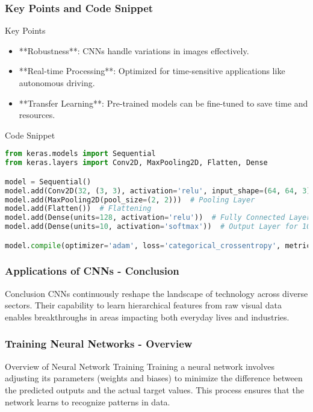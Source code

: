 \documentclass[aspectratio=169]{beamer}
\begin{document}
\begin{frame}[fragile]
    \frametitle{Key Points and Code Snippet}
    \begin{block}{Key Points}
        \begin{itemize}
            \item **Robustness**: CNNs handle variations in images effectively.
            \item **Real-time Processing**: Optimized for time-sensitive applications like autonomous driving.
            \item **Transfer Learning**: Pre-trained models can be fine-tuned to save time and resources.
        \end{itemize}
    \end{block}
    
    \begin{block}{Code Snippet}
        \begin{lstlisting}[language=Python]
from keras.models import Sequential
from keras.layers import Conv2D, MaxPooling2D, Flatten, Dense

model = Sequential()
model.add(Conv2D(32, (3, 3), activation='relu', input_shape=(64, 64, 3)))  # Convolutional Layer
model.add(MaxPooling2D(pool_size=(2, 2)))  # Pooling Layer
model.add(Flatten())  # Flattening
model.add(Dense(units=128, activation='relu'))  # Fully Connected Layer
model.add(Dense(units=10, activation='softmax'))  # Output Layer for 10 classes

model.compile(optimizer='adam', loss='categorical_crossentropy', metrics=['accuracy'])
        \end{lstlisting}
    \end{block}
\end{frame}

\begin{frame}[fragile]
    \frametitle{Applications of CNNs - Conclusion}
    \begin{block}{Conclusion}
        CNNs continuously reshape the landscape of technology across diverse sectors. 
        Their capability to learn hierarchical features from raw visual data enables breakthroughs in areas impacting both everyday lives and industries.
    \end{block}
\end{frame}

\begin{frame}[fragile]
    \frametitle{Training Neural Networks - Overview}
    \begin{block}{Overview of Neural Network Training}
        Training a neural network involves adjusting its parameters (weights and biases) to minimize the difference between the predicted outputs and the actual target values. This process ensures that the network learns to recognize patterns in data.
    \end{block}
\end{frame}
\end{document}
